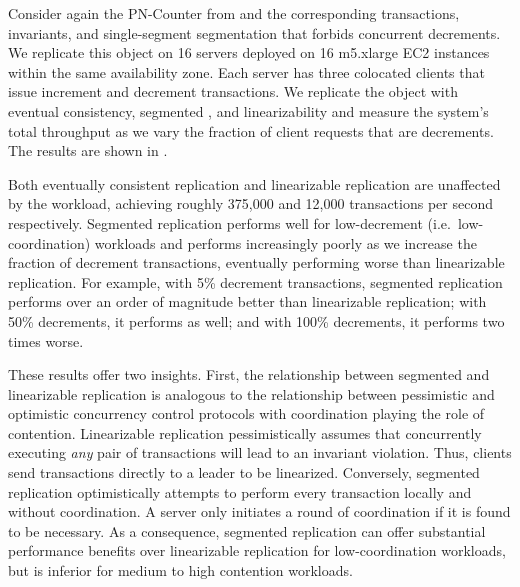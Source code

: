 \begin{benchmark}
  Consider again the PN-Counter from  and the
  corresponding transactions, invariants, and single-segment segmentation that
  forbids concurrent decrements. We replicate this object on 16 servers
  deployed on 16 m5.xlarge EC2 instances within the same availability zone.
  Each server has three colocated clients that issue increment and decrement
  transactions. We replicate the object with eventual consistency, segmented
  \invariantconfluence{}, and linearizability and measure the system's total
  throughput as we vary the fraction of client requests that are decrements.
  The results are shown in .

  Both eventually consistent replication and linearizable replication are
  unaffected by the workload, achieving roughly 375,000 and 12,000 transactions
  per second respectively. Segmented \invariantconfluent{} replication performs
  well for low-decrement (i.e.\ low-coordination) workloads and performs
  increasingly poorly as we increase the fraction of decrement transactions,
  eventually performing worse than linearizable replication. For example, with
  5\% decrement transactions, segmented \invariantconfluent{} replication
  performs over an order of magnitude better than linearizable replication;
  with 50\% decrements, it performs as well; and with 100\% decrements, it
  performs two times worse.


  These results offer two insights.
  First, the relationship between segmented \invariantconfluent{} and
  linearizable replication is analogous to the relationship between pessimistic
  and optimistic concurrency control protocols with coordination playing the
  role of contention. Linearizable replication pessimistically assumes that
  concurrently executing \emph{any} pair of transactions will lead to an
  invariant violation. Thus, clients send transactions directly to a leader to
  be linearized. Conversely, segmented \invariantconfluent{} replication
  optimistically attempts to perform every transaction locally and without
  coordination. A server only initiates a round of coordination if it is found
  to be necessary. As a consequence, segmented \invariantconfluent{}
  replication can offer substantial performance benefits over linearizable
  replication for low-coordination workloads, but is inferior for medium to
  high contention workloads.


\end{benchmark}
